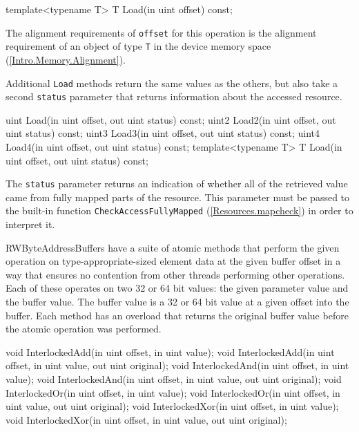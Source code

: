 \begin{HLSL}
  template<typename T>
  T Load(in uint offset) const;
\end{HLSL}

The alignment requirements of \texttt{offset} for this operation is the alignment requirement
of an object of type \texttt{T} in the device memory space (\ref{Intro.Memory.Alignment}).

Additional \texttt{Load} methods return the same values as the others,
but also take a second \texttt{status} parameter that returns information about the accessed resource.
\begin{HLSL}
  uint Load(in uint offset, out uint status) const;
  uint2 Load2(in uint offset, out uint status) const;
  uint3 Load3(in uint offset, out uint status) const;
  uint4 Load4(in uint offset, out uint status) const;
  template<typename T>
  T Load(in uint offset, out uint status) const;
\end{HLSL}

The \texttt{status} parameter returns an indication of whether all of the retrieved value
came from fully mapped parts of the resource.
This parameter must be passed to the built-in function \texttt{CheckAccessFullyMapped} (\ref{Resources.mapcheck})
in order to interpret it.


RWByteAddressBuffers have a suite of atomic methods that perform the given operation
on type-appropriate-sized element data at the given buffer offset
in a way that ensures no contention from other threads performing other operations.
Each of these operates on two 32 or 64 bit values: the given parameter value and the buffer value.
The buffer value is a 32 or 64 bit value at a given offset into the buffer.
Each method has an overload that returns the original buffer value before the atomic operation was performed.

\begin{HLSL}
   void InterlockedAdd(in uint offset, in uint value);
   void InterlockedAdd(in uint offset, in uint value, out uint original);
   void InterlockedAnd(in uint offset, in uint value);
   void InterlockedAnd(in uint offset, in uint value, out uint original);
   void InterlockedOr(in uint offset, in uint value);
   void InterlockedOr(in uint offset, in uint value, out uint original);
   void InterlockedXor(in uint offset, in uint value);
   void InterlockedXor(in uint offset, in uint value, out uint original);
\end{HLSL}

